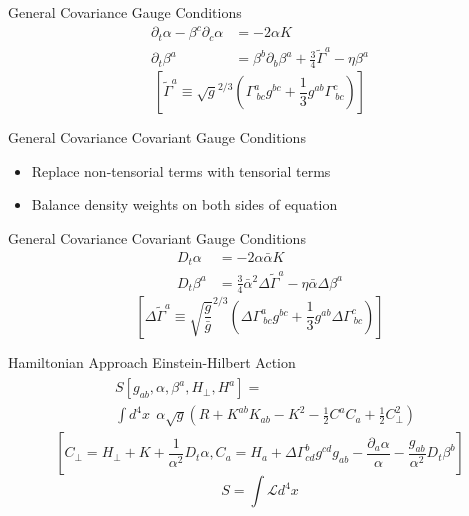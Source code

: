 \documentclass[xcolor=dvipsnames]{beamer}
\begin{document}
	\begin{frame}{General Covariance}
		Gauge Conditions
		\pause
		\begin{align*}
			\partial_{t}\alpha - \beta^{c}\partial_{c}\alpha &= -2\alpha K\\
			\partial_{t}\beta^{a} &= \beta^{b}\partial_{b}\beta^{a} + \frac{3}{4}{\tilde \Gamma}^{a} - \eta \beta^{a}
		\end{align*}
		\tiny
		\[
		\left[{\tilde \Gamma}^{a} \equiv \sqrt{g}^{2/3}\left(\Gamma^{a}_{~bc}g^{bc} + \frac{1}{3}g^{ab}\Gamma^{c}_{~bc}\right)\right]
		\]
	\end{frame}
	\begin{frame}{General Covariance}
		Covariant Gauge Conditions
		\pause
		\begin{itemize}
			\item{Replace non-tensorial terms with tensorial terms}
			\item{Balance density weights on both sides of equation}
		\end{itemize}
	\end{frame}
	\begin{frame}{General Covariance}
		Covariant Gauge Conditions
		\begin{align*}
			D_{t}\alpha &= -2\alpha{\bar \alpha}K\\
			D_{t}\beta^{a} &= \frac{3}{4}{\bar \alpha}^{2}\Delta {\tilde \Gamma}^{a} - \eta {\bar \alpha}\Delta\beta^{a}  
		\end{align*}
		\tiny
		\[
			\left[\Delta {\tilde \Gamma}^{a} \equiv \sqrt{\frac{g}{{\bar g}}}^{2/3}\left(\Delta \Gamma^{a}_{~bc}g^{bc} + \frac{1}{3}g^{ab}\Delta \Gamma^{c}_{~bc}\right)\right]
		\]
	\end{frame}
	\begin{frame}{Hamiltonian Approach}
		Einstein-Hilbert Action
		\begin{align*}
			\begin{split}
				&S\left[g_{ab}, \alpha, \beta^{a}, H_{\perp}, H^{a}\right] =\\&\int d^{4}x~~\alpha \sqrt{g} \left( R + K^{ab}K_{ab} - K^{2} - \frac{1}{2}C^{a}C_{a} + \frac{1}{2}C_{\perp}^{2}\right)
			\end{split}
		\end{align*}
		\tiny
		\[		
		\left[ C_{\perp} = H_{\perp} + K + \frac{1}{\alpha^{2}}D_{t}\alpha, C_{a} = H_{a} + \Delta \Gamma^{b}_{cd}g^{cd}g_{ab} - \frac{\partial_{a}\alpha}{\alpha} - \frac{g_{ab}}{\alpha^2}D_{t}\beta^{b} \right]
		\]
		\pause
		\normalsize
		\[
		S = \int\mathscr{L}d^{4}x
		\]
	\end{frame}
\end{document}

